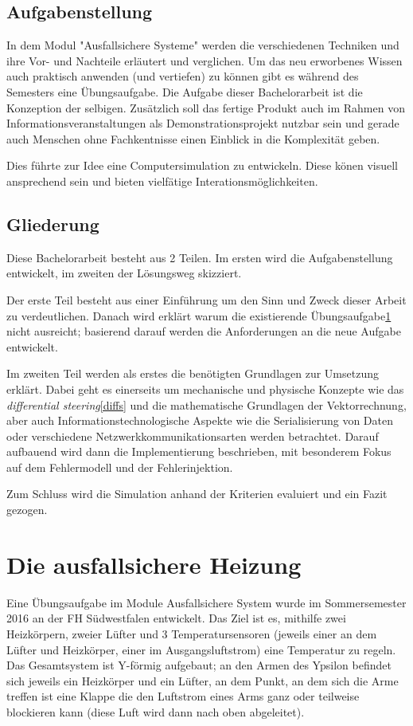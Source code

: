 \subsection{Aufgabenstellung} In dem Modul "Ausfallsichere Systeme" werden die verschiedenen Techniken und ihre Vor- und Nachteile
erl{\"{a}}utert und verglichen. Um das neu erworbenes Wissen auch praktisch anwenden (und vertiefen) zu k{\"{o}}nnen gibt es w{\"{a}}hrend des Semesters eine {\"{U}}bungsaufgabe.
Die Aufgabe dieser Bachelorarbeit ist die Konzeption der selbigen. Zus{\"{a}}tzlich soll das fertige Produkt auch im Rahmen von Informationsveranstaltungen als Demonstrationsprojekt
nutzbar sein und gerade auch Menschen ohne Fachkentnisse einen Einblick in die Komplexit{\"{a}}t geben.

Dies f{\"{u}}hrte zur Idee eine Computersimulation zu entwickeln. Diese k{\"{o}}nen visuell ansprechend sein und bieten vielf{\"{a}}tige Interationsm{\"{o}}glichkeiten.

\subsection{Gliederung} Diese Bachelorarbeit besteht aus 2 Teilen. Im ersten wird die Aufgabenstellung entwickelt, im zweiten der L{\"{o}}sungsweg skizziert.

Der erste Teil besteht aus einer Einf{\"{u}}hrung um den Sinn und Zweck dieser Arbeit zu verdeutlichen. Danach wird erkl{\"{a}}rt warum die existierende {\"{U}}bungsaufgabe\ref{heizung}
nicht ausreicht; basierend darauf werden die Anforderungen an die neue Aufgabe entwickelt.

Im zweiten Teil werden als erstes die ben{\"{o}}tigten Grundlagen zur Umsetzung erkl{\"{a}}rt. Dabei geht es einerseits um mechanische und physische Konzepte wie das
\textit{differential steering}\ref{diffs} und die mathematische Grundlagen der Vektorrechnung, aber auch Informationstechnologische Aspekte wie die Serialisierung von Daten oder
verschiedene Netzwerkkommunikationsarten werden betrachtet. Darauf aufbauend wird dann die Implementierung beschrieben, mit besonderem Fokus auf dem Fehlermodell und der
Fehlerinjektion.

Zum Schluss wird die Simulation anhand der Kriterien evaluiert und ein Fazit gezogen.

\clearpage
\section{Die ausfallsichere Heizung}\label{heizung}
Eine {\"{U}}bungsaufgabe im Module Ausfallsichere System wurde im Sommersemester 2016 an der FH S{\"{u}}dwestfalen entwickelt. Das Ziel ist es, mithilfe zwei Heizk{\"{o}}rpern, zweier
L{\"{u}}fter und 3 Temperatursensoren (jeweils einer an dem L{\"{u}}fter und Heizk{\"{o}}rper, einer im Ausgangsluftstrom) eine Temperatur zu regeln.
Das Gesamtsystem ist Y-f{\"{o}}rmig aufgebaut; an den Armen des Ypsilon befindet sich jeweils ein Heizk{\"{o}}rper und ein L{\"{u}}fter, an dem Punkt, an dem sich
die Arme treffen ist eine Klappe die den Luftstrom eines Arms ganz oder teilweise blockieren kann (diese Luft wird dann nach oben abgeleitet).

